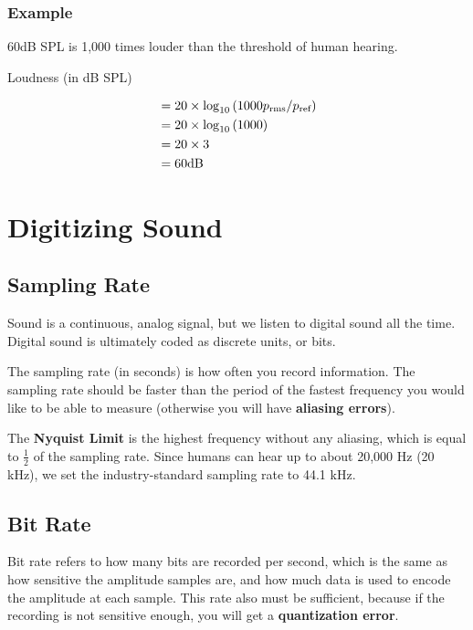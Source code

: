 \documentclass[12pt]{article}
\begin{document}
\subsubsection{Example}

60dB SPL is 1,000 times louder than the threshold of human hearing.

Loudness (in dB SPL)

\begin{align*}
&= 20 \times \log_{10}\pqty{1000 p_{\text{rms}}/p_{\text{ref}}} \\
&= 20 \times \log_{10}\pqty{1000} \\
&= 20 \times 3 \\
&= 60 \text{dB} \\
\end{align*}

\section{Digitizing Sound}

\subsection{Sampling Rate}

Sound is a continuous, analog signal, but we listen to digital sound all the
time. Digital sound is ultimately coded as discrete units, or bits.

The sampling rate (in seconds) is how often you record information. The sampling
rate should be faster than the period of the fastest frequency you would like to
be able to measure (otherwise you will have \textbf{aliasing errors}). 

The \textbf{Nyquist Limit} is the highest frequency without any aliasing, which
is equal to $\frac{1}{2}$ of the sampling rate. Since humans can hear up to
about 20,000 Hz (20 kHz), we set the industry-standard sampling rate to 44.1 kHz.

\subsection{Bit Rate}

Bit rate refers to how many bits are recorded per second, which is the same as
how sensitive the amplitude samples are, and how much data is used to encode the
amplitude at each sample. This rate also must be sufficient, because if the
recording is not sensitive enough, you will get a \textbf{quantization error}.
\end{document}
